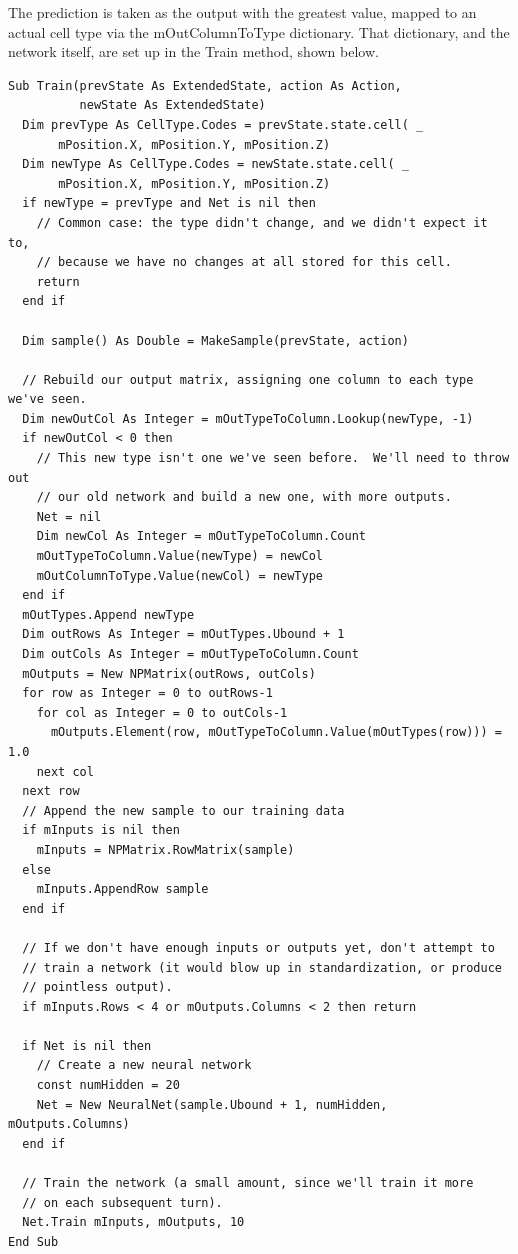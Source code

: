 \documentclass{article}
\begin{document}
The prediction is taken as the output with the greatest value, mapped to an actual cell type via the mOutColumnToType dictionary.  That dictionary, and the network itself, are set up in the Train method, shown below.

\begin{lstlisting}
Sub Train(prevState As ExtendedState, action As Action,
          newState As ExtendedState)
  Dim prevType As CellType.Codes = prevState.state.cell( _
       mPosition.X, mPosition.Y, mPosition.Z)
  Dim newType As CellType.Codes = newState.state.cell( _
       mPosition.X, mPosition.Y, mPosition.Z)
  if newType = prevType and Net is nil then
    // Common case: the type didn't change, and we didn't expect it to,
    // because we have no changes at all stored for this cell.
    return
  end if
  
  Dim sample() As Double = MakeSample(prevState, action)
  
  // Rebuild our output matrix, assigning one column to each type we've seen.
  Dim newOutCol As Integer = mOutTypeToColumn.Lookup(newType, -1)
  if newOutCol < 0 then
    // This new type isn't one we've seen before.  We'll need to throw out
    // our old network and build a new one, with more outputs.
    Net = nil
    Dim newCol As Integer = mOutTypeToColumn.Count
    mOutTypeToColumn.Value(newType) = newCol
    mOutColumnToType.Value(newCol) = newType
  end if
  mOutTypes.Append newType
  Dim outRows As Integer = mOutTypes.Ubound + 1
  Dim outCols As Integer = mOutTypeToColumn.Count
  mOutputs = New NPMatrix(outRows, outCols)
  for row as Integer = 0 to outRows-1
    for col as Integer = 0 to outCols-1
      mOutputs.Element(row, mOutTypeToColumn.Value(mOutTypes(row))) = 1.0
    next col
  next row
  // Append the new sample to our training data
  if mInputs is nil then
    mInputs = NPMatrix.RowMatrix(sample)
  else
    mInputs.AppendRow sample
  end if
  
  // If we don't have enough inputs or outputs yet, don't attempt to 
  // train a network (it would blow up in standardization, or produce
  // pointless output).
  if mInputs.Rows < 4 or mOutputs.Columns < 2 then return
  
  if Net is nil then
    // Create a new neural network
    const numHidden = 20
    Net = New NeuralNet(sample.Ubound + 1, numHidden, mOutputs.Columns)
  end if
  
  // Train the network (a small amount, since we'll train it more
  // on each subsequent turn).
  Net.Train mInputs, mOutputs, 10
End Sub
\end{lstlisting}
\end{document}
